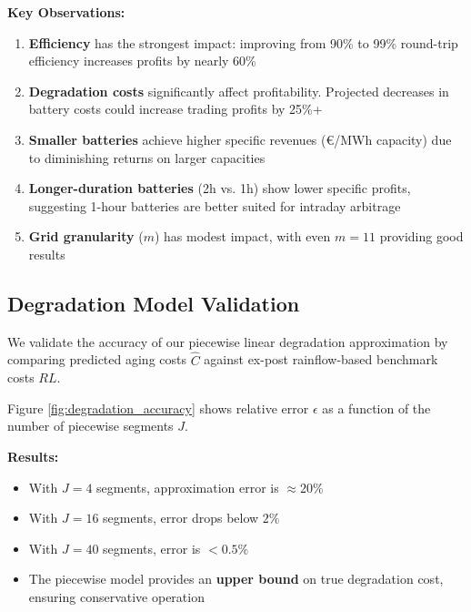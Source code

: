 \documentclass[10pt,twocolumn]{article}
\begin{document}
\textbf{Key Observations:}
\begin{enumerate}
\item \textbf{Efficiency} has the strongest impact: improving from 90\% to 99\% round-trip efficiency increases profits by nearly 60\%
\item \textbf{Degradation costs} significantly affect profitability. Projected decreases in battery costs could increase trading profits by 25\%+
\item \textbf{Smaller batteries} achieve higher specific revenues (€/MWh capacity) due to diminishing returns on larger capacities
\item \textbf{Longer-duration batteries} (2h vs. 1h) show lower specific profits, suggesting 1-hour batteries are better suited for intraday arbitrage
\item \textbf{Grid granularity} ($m$) has modest impact, with even $m=11$ providing good results
\end{enumerate}

\subsection{Degradation Model Validation}
We validate the accuracy of our piecewise linear degradation approximation by comparing predicted aging costs $\hat{C}$ against ex-post rainflow-based benchmark costs $RL$.

Figure \ref{fig:degradation_accuracy} shows relative error $\epsilon$ as a function of the number of piecewise segments $J$.


\textbf{Results:}
\begin{itemize}
\item With $J=4$ segments, approximation error is $\approx 20\%$
\item With $J=16$ segments, error drops below $2\%$
\item With $J=40$ segments, error is $< 0.5\%$
\item The piecewise model provides an \textbf{upper bound} on true degradation cost, ensuring conservative operation
\end{itemize}
\end{document}
